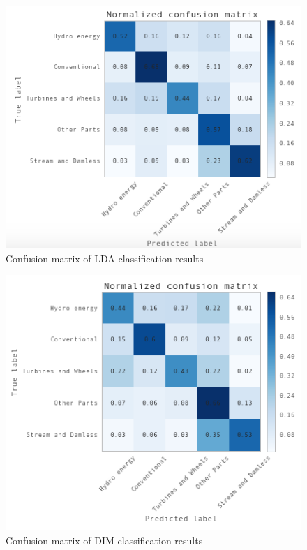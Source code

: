 \begin{figure}[!htb]
\centering
\includegraphics[scale=0.65]{Figures/ldaclass}
\decoRule
\caption[ldaclass]{Confusion matrix of LDA classification results}
\label{fig:LDAmatrix}
\end{figure}

\newpage 

\begin{figure}[!htb]
\centering
\includegraphics[scale=0.65]{Figures/dimclass}
\decoRule
\caption[dimclass]{Confusion matrix of DIM classification results}
\label{fig:DIMmatrix}
\end{figure}

